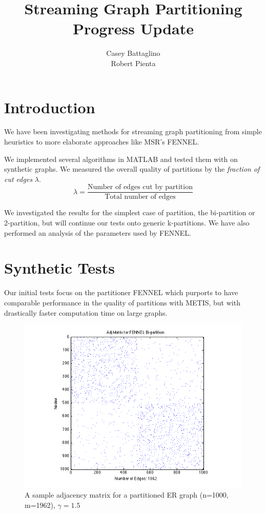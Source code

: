 \documentclass[11pt]{article}
\title{Streaming Graph Partitioning Progress Update}
\author{Casey Battaglino\\Robert Pienta}
\date{}
\begin{document}
\maketitle
\section*{Introduction} \vspace{-10 pt}
We have been investigating methods for streaming graph partitioning from simple heuristics to more elaborate approaches like MSR's FENNEL.

We implemented several algorithms in MATLAB and tested them with on synthetic graphs. 
We measured the overall quality of partitions by the \textit{fraction of cut edges} $\lambda$.
\[\lambda = \frac{\text{Number of edges cut by partition}}{\text{Total number of edges}}\]

We investigated the results for the simplest case of partition, the bi-partition or 2-partition, but will continue our tests onto generic k-partitions.  
We have also performed an analysis of the parameters used by FENNEL.

\section*{Synthetic Tests} \vspace{-10 pt}
Our initial tests focus on the partitioner FENNEL which purports to have comparable performance in the quality of partitions with METIS, but with drastically faster computation time on large graphs.

\begin{figure}[ht]
\centering
\caption{A sample adjacency matrix for a partitioned ER graph (n=1000, m=1962), $\gamma = 1.5$}
\includegraphics[scale=.65] {figures/adj_spy.png}
\end{figure}
\end{document}
